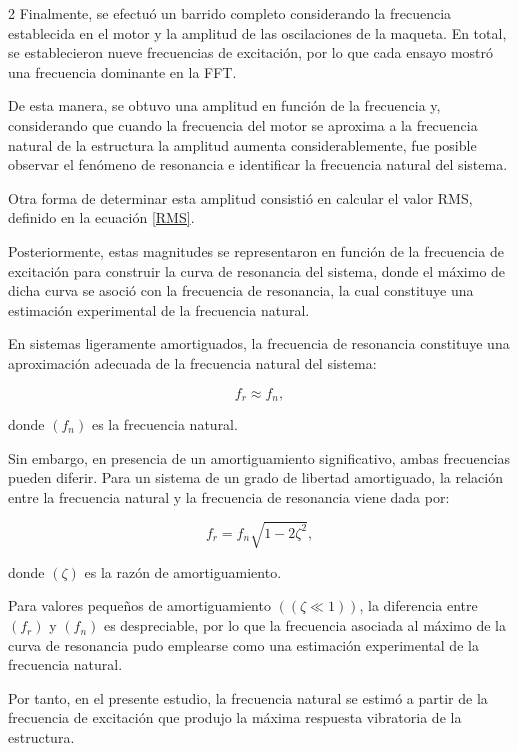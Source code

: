 \documentclass[10pt]{article}
\begin{document}
\begin{multicols}{2}
Finalmente, se efectuó un barrido completo considerando la frecuencia establecida en el motor y la amplitud de las oscilaciones de la maqueta. En total, se establecieron nueve frecuencias de excitación, por lo que cada ensayo mostró una frecuencia dominante en la FFT.

De esta manera, se obtuvo una amplitud en función de la frecuencia y, considerando que cuando la frecuencia del motor se aproxima a la frecuencia natural de la estructura la amplitud aumenta considerablemente, fue posible observar el fenómeno de resonancia e identificar la frecuencia natural del sistema.

Otra forma de determinar esta amplitud consistió en calcular el valor RMS, definido en la ecuación \eqref{RMS}.

Posteriormente, estas magnitudes se representaron en función de la frecuencia de excitación para construir la curva de resonancia del sistema, donde el máximo de dicha curva se asoció con la frecuencia de resonancia, la cual constituye una estimación experimental de la frecuencia natural.

En sistemas ligeramente amortiguados, la frecuencia de resonancia constituye una aproximación adecuada de la frecuencia natural del sistema:

\begin{equation}
f_r \approx f_n,
\end{equation}

donde $(f_n)$ es la frecuencia natural.

Sin embargo, en presencia de un amortiguamiento significativo, ambas frecuencias pueden diferir. Para un sistema de un grado de libertad amortiguado, la relación entre la frecuencia natural y la frecuencia de resonancia viene dada por:

\begin{equation}
f_r=f_n\sqrt{1-2\zeta^2},
\end{equation}

donde $(\zeta)$ es la razón de amortiguamiento.

Para valores pequeños de amortiguamiento $((\zeta \ll 1))$, la diferencia entre $(f_r)$ y $(f_n)$ es despreciable, por lo que la frecuencia asociada al máximo de la curva de resonancia pudo emplearse como una estimación experimental de la frecuencia natural.

Por tanto, en el presente estudio, la frecuencia natural se estimó a partir de la frecuencia de excitación que produjo la máxima respuesta vibratoria de la estructura.


\end{multicols}
\end{document}
